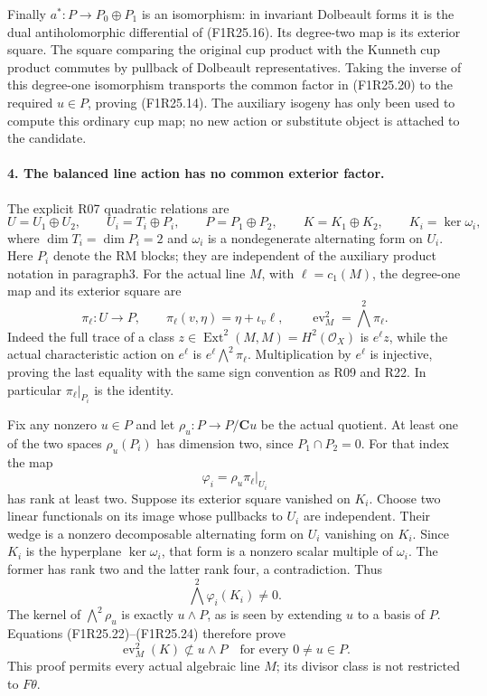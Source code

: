 Finally $a^*:P\to P_0\oplus P_1$ is an isomorphism:
in invariant Dolbeault forms it is the dual
antiholomorphic differential of (F1R25.16).
Its degree-two map is its exterior square.
The square comparing the original cup product
with the Kunneth cup product commutes by
pullback of Dolbeault representatives. Taking
the inverse of this degree-one isomorphism
transports the common factor in (F1R25.20)
to the required $u\in P$, proving (F1R25.14).
The auxiliary isogeny has only been used to
compute this ordinary cup map; no new action
or substitute object is attached to the candidate.

\paragraph{4. The balanced line action has no common exterior factor.}
The explicit R07 quadratic relations are
\[
 U=U_1\oplus U_2,\qquad U_i=T_i\oplus P_i,\qquad
 P=P_1\oplus P_2,\qquad
 K=K_1\oplus K_2,\qquad K_i=\ker\omega_i,
 \tag{F1R25.21}
\]
where $\dim T_i=\dim P_i=2$ and $\omega_i$ is a
nondegenerate alternating form on $U_i$.
Here $P_i$ denote the RM blocks; they are
independent of the auxiliary product notation
in paragraph3.
For the actual line $M$, with $\ell=c_1(M)$,
the degree-one map and its exterior square are
\[
 \pi_\ell:U\longrightarrow P,\qquad
              \pi_\ell(v,\eta)=\eta+\iota_v\ell,
       \qquad
              \operatorname{ev}_M^2=\bigwedge^2\pi_\ell.
 \tag{F1R25.22}
\]
Indeed the full trace of a class
$z\in\operatorname{Ext}^2(M,M)=H^2(\mathcal O_X)$
is $e^\ell z$, while the actual characteristic
action on $e^\ell$ is
$e^\ell\bigwedge^2\pi_\ell$. Multiplication by
$e^\ell$ is injective, proving the last equality
with the same sign convention as R09 and R22.
In particular $\pi_\ell|_{P_i}$ is the identity.

Fix any nonzero $u\in P$ and let
$\rho_u:P\to P/\mathbf C u$ be the actual quotient.
At least one of the two spaces $\rho_u(P_i)$ has
dimension two, since $P_1\cap P_2=0$.
For that index the map
\[
                    \varphi_i=\rho_u\pi_\ell|_{U_i}
 \tag{F1R25.23}
\]
has rank at least two.
Suppose its exterior square vanished on $K_i$.
Choose two linear functionals on its image whose
pullbacks to $U_i$ are independent. Their wedge
is a nonzero decomposable alternating form on
$U_i$ vanishing on $K_i$. Since $K_i$ is the
hyperplane $\ker\omega_i$, that form is a
nonzero scalar multiple of $\omega_i$.
The former has rank two and the latter rank
four, a contradiction. Thus
\[
                    \bigwedge^2\varphi_i(K_i)\ne0.
 \tag{F1R25.24}
\]
The kernel of $\bigwedge^2\rho_u$ is exactly
$u\wedge P$, as is seen by extending $u$ to a
basis of $P$. Equations (F1R25.22)--(F1R25.24)
therefore prove
\[
        \operatorname{ev}_M^2(K)\not\subset u\wedge P
                              \quad\text{for every }0\ne u\in P.
 \tag{F1R25.25}
\]
This proof permits every actual algebraic line
$M$; its divisor class is not restricted to
$F\theta$.

